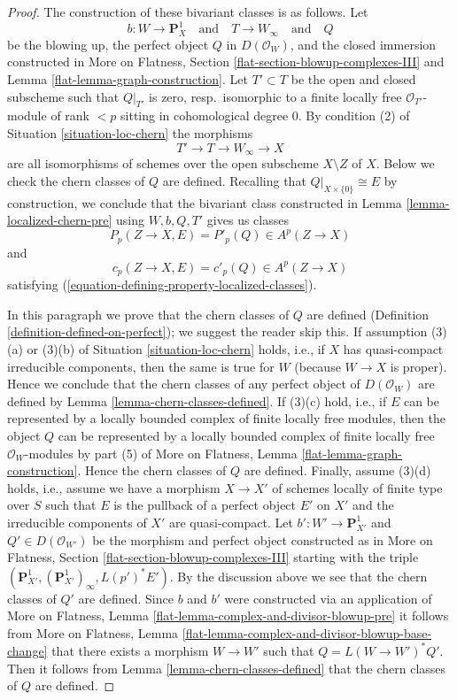 \documentclass[10pt,a4paper]{amsart}
\theoremstyle{plain}
\theoremstyle{definition}
\theoremstyle{remark}
\numberwithin{equation}{subsection}
\begin{document}
\begin{proof}
The construction of these bivariant classes is as follows. Let
$$
b : W \longrightarrow \mathbf{P}^1_X
\quad\text{and}\quad
T \longrightarrow W_\infty
\quad\text{and}\quad
Q
$$
be the blowing up, the perfect object $Q$ in $D(\mathcal{O}_W)$,
and the closed immersion constructed in
More on Flatness, Section \ref{flat-section-blowup-complexes-III}
and Lemma \ref{flat-lemma-graph-construction}.
Let $T' \subset T$ be the open and closed subscheme such that
$Q|_{T'}$ is zero, resp.\ isomorphic to a
finite locally free $\mathcal{O}_{T'}$-module of rank $< p$
sitting in cohomological degree $0$. By condition (2) of
Situation \ref{situation-loc-chern} the morphisms
$$
T' \to T \to W_\infty \to X
$$
are all isomorphisms of schemes over the open subscheme $X \setminus Z$ of $X$.
Below we check the chern classes of $Q$ are defined.
Recalling that $Q|_{X \times \{0\}} \cong E$ by construction, we conclude
that the bivariant class constructed in Lemma \ref{lemma-localized-chern-pre}
using $W, b, Q, T'$ gives us classes
$$
P_p(Z \to X, E) = P'_p(Q) \in A^p(Z \to X)
$$
and
$$
c_p(Z \to X, E) = c'_p(Q) \in A^p(Z \to X)
$$
satisfying (\ref{equation-defining-property-localized-classes}).

\medskip\noindent
In this paragraph we prove that the chern classes of $Q$ are defined
(Definition \ref{definition-defined-on-perfect}); we suggest the reader skip
this. If assumption (3)(a) or (3)(b) of Situation \ref{situation-loc-chern}
holds, i.e., if $X$ has quasi-compact irreducible components, then the
same is true for $W$ (because $W \to X$ is proper). Hence we conclude that
the chern classes of any perfect object of $D(\mathcal{O}_W)$ are defined by
Lemma \ref{lemma-chern-classes-defined}. If (3)(c) hold, i.e., if
$E$ can be represented by a locally bounded complex of finite locally
free modules, then the object $Q$ can be represented by a locally bounded
complex of finite locally free $\mathcal{O}_W$-modules by part (5) of
More on Flatness, Lemma \ref{flat-lemma-graph-construction}. Hence the
chern classes of $Q$ are defined. Finally, assume (3)(d) holds, i.e.,
assume we have a morphism $X \to X'$ of schemes locally of finite type
over $S$ such that $E$ is the pullback of a perfect object $E'$ on $X'$ and
the irreducible components of $X'$ are quasi-compact.
Let $b' : W' \to \mathbf{P}^1_{X'}$ and $Q' \in D(\mathcal{O}_{W'})$
be the morphism and perfect object constructed as
in More on Flatness, Section \ref{flat-section-blowup-complexes-III}
starting with the triple
$(\mathbf{P}^1_{X'}, (\mathbf{P}^1_{X'})_\infty, L(p')^*E')$.
By the discussion above we see that the chern classes of $Q'$
are defined. Since $b$ and $b'$ were constructed via an application of
More on Flatness, Lemma \ref{flat-lemma-complex-and-divisor-blowup-pre}
it follows from
More on Flatness, Lemma \ref{flat-lemma-complex-and-divisor-blowup-base-change}
that there exists a morphism $W \to W'$ such that
$Q = L(W \to W')^*Q'$. Then it follows from
Lemma \ref{lemma-chern-classes-defined}
that the chern classes of $Q$ are defined.
\end{proof}
\end{document}
